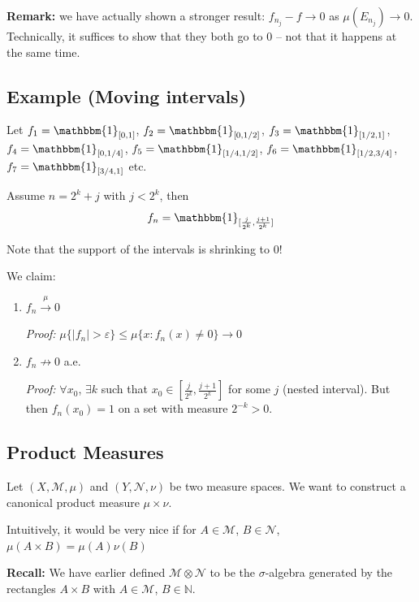\documentclass[12pt]{report}
\newcommand{\N}{\mathbb{N}}
\newcommand{\ind}{\mathbbm{1}}
\newcommand{\abs}[1]{\left\vert #1 \right\vert}
\newcommand{\ep}{\varepsilon}
\newcommand{\M}{\mathcal{M}}
\newcommand{\Nc}{\mathcal{N}}
\newcommand*{\tbf}[1]{\ifmmode\mathbf{#1}\else\textbf{#1}\fi}
\newenvironment*{proof}[1][blue]{
\begin{tcolorbox}[
    parbox=false,
    colback=#1!5!white,
    colframe=#1!75!black,
    breakable
]}
{\end{tcolorbox}}
\begin{document}
    \tbf{Remark:} we have actually shown a stronger result: $f_{n_j} - f \to 0$ as $\mu(E_{n_j}) \to 0$. Technically, it suffices to show that they both go to $0$ -- not that it happens at the same time.

    \subsection*{Example (Moving intervals)} 
        Let $f_1 = \ind_{[0, 1]}$, $f_2 = \ind_{[0, 1/2]}$, $f_3 = \ind_{[1/2, 1]}$, $f_4 = \ind_{[0, 1/4]}$, $f_5 = \ind_{[1/4, 1/2]}$, $f_6 = \ind_{[1/2, 3/4]}$, $f_7 = \ind_{[3/4, 1]}$ etc.

        Assume $n = 2^k + j$ with $j < 2^k$, then 
        \[f_n = \ind_{[\frac{j}{2^k}, \frac{j+1}{2^k}]}\]

        Note that the support of the intervals is shrinking to $0$!

        We claim:
        \begin{enumerate}
            \item $f_n \overset{\mu}{\longrightarrow} 0$ 
            
            \begin{proof}
                \emph{Proof:} $\mu\{\abs{f_n} > \ep\} \leq \mu\{x: f_n(x) \neq 0\} \to 0$
            \end{proof}

            \item $f_n \not\to 0$ a.e. 
            
            \begin{proof}
                \emph{Proof:} $\forall x_0$, $\exists k$ such that $x_0 \in [\frac{j}{2^k}, \frac{j+1}{2^k}]$ for some $j$ (nested interval). But then $f_n(x_0) = 1$ on a set with measure $2^{-k} > 0$.
            \end{proof}
        \end{enumerate}

    \subsection*{Product Measures}
        Let $(X, \M, \mu)$ and $(Y, \Nc, \nu)$ be two measure spaces. We want to construct a canonical product measure $\mu \times \nu$. 
        
        Intuitively, it would be very nice if for $A \in \M$, $B \in \Nc$, $\mu(A \times B) = \mu(A) \nu(B)$

        \tbf{Recall:} We have earlier defined $\M \otimes \Nc$ to be the $\sigma$-algebra generated by the rectangles $A \times B$ with $A \in \M$, $B \in \N$.
\end{document}
